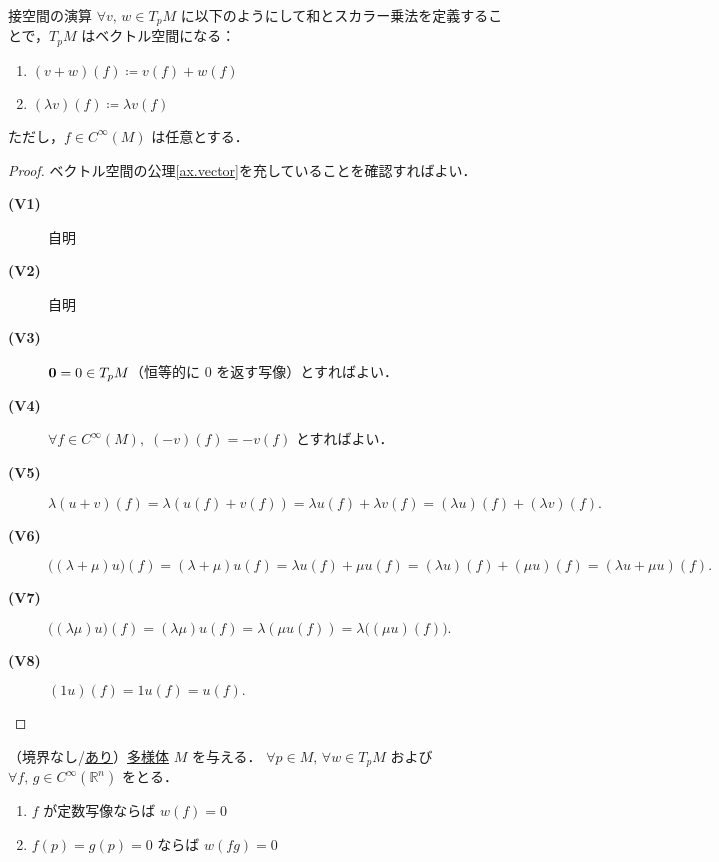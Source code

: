 \documentclass[geometry_main]{subfiles}
\begin{document}
\begin{mydef}[label=def.op_tangent]{接空間の演算}
	$\forall v,\, w \in T_pM$ に以下のようにして和とスカラー乗法を定義することで，$T_pM$ はベクトル空間になる：
	\begin{enumerate}
		\item $(v+w)(f) \coloneqq v(f) + w(f)$
		\item $(\lambda v)(f) \coloneqq \lambda v(f)$
	\end{enumerate}
	ただし，$f \in C^\infty(M)$ は任意とする．
\end{mydef}
\begin{proof}
	ベクトル空間の公理\ref{ax.vector}を充していることを確認すればよい．
	\begin{description}
		\item[\textbf{(V1)}] 自明
		\item[\textbf{(V2)}] 自明
		\item[\textbf{(V3)}] $\vb*{0} = 0 \in T_pM$（恒等的に $0$ を返す写像）とすればよい．
		\item[\textbf{(V4)}] $\forall f \in C^\infty (M),\; (-v)(f) = -v(f)$ とすればよい． 
		\item[\textbf{(V5)}] $\lambda (u + v)(f) = \lambda (u(f) + v(f)) = \lambda u(f) + \lambda v(f) = (\lambda u)(f) + (\lambda v)(f).$
		\item[\textbf{(V6)}] $\bigl((\lambda + \mu) u \bigr) (f) = (\lambda+\mu)u(f) = \lambda u(f) + \mu u(f) = (\lambda u)(f) + (\mu u)(f) = (\lambda u + \mu u)(f).$
		\item[\textbf{(V7)}] $\bigl((\lambda\mu)u\bigr)(f) = (\lambda\mu)u(f) = \lambda (\mu u(f)) = \lambda \bigl((\mu u)(f)\bigr).$
		\item[\textbf{(V8)}] $(1 u)(f) = 1 u(f) = u(f).$
	\end{description}
\end{proof}

\begin{mylem}[label=lem:tangentv]{}
	（境界なし/\hyperref[def:mani-with-boundary]{あり}）\hyperref[diffmani]{\cinfty 多様体} $M$ を与える． 
	$\forall p \in M,\, \forall w \in T_p M$ および $\forall f,\, g \in C^\infty(\mathbb{R}^n)$ をとる．
	\begin{enumerate}
		\item $f$ が定数写像ならば $w(f) = 0$
		\item $f(p) = g(p) = 0$ ならば $w(fg) = 0$
	\end{enumerate}
\end{mylem}
\end{document}

